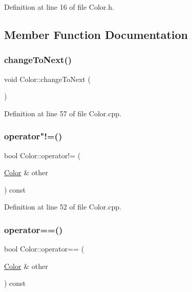 Definition at line 16 of file Color.\+h.



\subsection{Member Function Documentation}
\mbox{\label{struct_color_a18edabbf8e25cbe1d3eb90e6561e6e62}} 
\subsubsection{\texorpdfstring{change\+To\+Next()}{changeToNext()}}
{\footnotesize\ttfamily void Color\+::change\+To\+Next (\begin{DoxyParamCaption}{ }\end{DoxyParamCaption})}



Definition at line 57 of file Color.\+cpp.

\mbox{\label{struct_color_a5e6b0ee87e2110887bdcd2cba81bf2bb}} 
\subsubsection{\texorpdfstring{operator"!=()}{operator!=()}}
{\footnotesize\ttfamily bool Color\+::operator!= (\begin{DoxyParamCaption}\item[{\hyperlink{struct_color}{Color} \&}]{other }\end{DoxyParamCaption}) const}



Definition at line 52 of file Color.\+cpp.

\mbox{\label{struct_color_ab950c33dd4a93662106299a310208fd5}} 
\subsubsection{\texorpdfstring{operator==()}{operator==()}}
{\footnotesize\ttfamily bool Color\+::operator== (\begin{DoxyParamCaption}\item[{\hyperlink{struct_color}{Color} \&}]{other }\end{DoxyParamCaption}) const}



